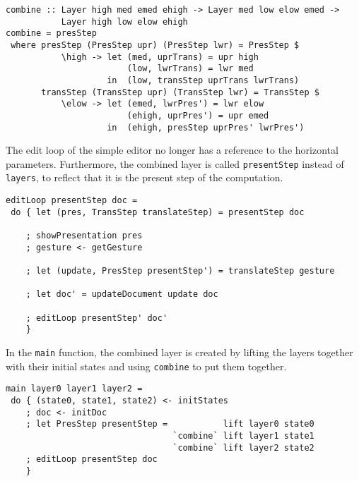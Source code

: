 \begin{small}
\begin{verbatim}
combine :: Layer high med emed ehigh -> Layer med low elow emed -> 
           Layer high low elow ehigh
combine = presStep
 where presStep (PresStep upr) (PresStep lwr) = PresStep $ 
           \high -> let (med, uprTrans) = upr high
                        (low, lwrTrans) = lwr med
                    in  (low, transStep uprTrans lwrTrans)
       transStep (TransStep upr) (TransStep lwr) = TransStep $
           \elow -> let (emed, lwrPres') = lwr elow
                        (ehigh, uprPres') = upr emed
                    in  (ehigh, presStep uprPres' lwrPres') 
\end{verbatim}
\end{small}


The edit loop of the simple editor no longer has a reference to the horizontal parameters. Furthermore, the combined layer is called \texttt{presentStep} instead of \texttt{layers}, to reflect that it is the present step of the computation.

\begin{small}
\begin{verbatim}
editLoop presentStep doc = 
 do { let (pres, TransStep translateStep) = presentStep doc

    ; showPresentation pres
    ; gesture <- getGesture
    
    ; let (update, PresStep presentStep') = translateStep gesture
    
    ; let doc' = updateDocument update doc
    
    ; editLoop presentStep' doc'
    }
\end{verbatim}
\end{small}

In the \texttt{main} function, the combined layer is created by lifting the layers together with their initial states and using \texttt{combine} to put them together.

\begin{small}
\begin{verbatim}
main layer0 layer1 layer2 =
 do { (state0, state1, state2) <- initStates
    ; doc <- initDoc 
    ; let PresStep presentStep =           lift layer0 state0 
                                 `combine` lift layer1 state1
                                 `combine` lift layer2 state2
    ; editLoop presentStep doc
    }
\end{verbatim}
\end{small}


